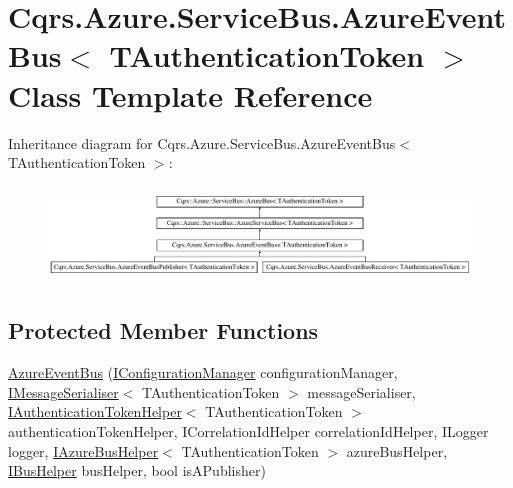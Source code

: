 \hypertarget{classCqrs_1_1Azure_1_1ServiceBus_1_1AzureEventBus}{}\section{Cqrs.\+Azure.\+Service\+Bus.\+Azure\+Event\+Bus$<$ T\+Authentication\+Token $>$ Class Template Reference}
\label{classCqrs_1_1Azure_1_1ServiceBus_1_1AzureEventBus}
Inheritance diagram for Cqrs.\+Azure.\+Service\+Bus.\+Azure\+Event\+Bus$<$ T\+Authentication\+Token $>$\+:\begin{figure}[H]
\begin{center}
\leavevmode
\includegraphics[height=2.533937cm]{classCqrs_1_1Azure_1_1ServiceBus_1_1AzureEventBus}
\end{center}
\end{figure}
\subsection*{Protected Member Functions}
\begin{DoxyCompactItemize}
\item 
\hyperlink{classCqrs_1_1Azure_1_1ServiceBus_1_1AzureEventBus_aaaf74d2e4e79924b7231750478508ed6_aaaf74d2e4e79924b7231750478508ed6}{Azure\+Event\+Bus} (\hyperlink{interfaceCqrs_1_1Configuration_1_1IConfigurationManager}{I\+Configuration\+Manager} configuration\+Manager, \hyperlink{interfaceCqrs_1_1Azure_1_1ServiceBus_1_1IMessageSerialiser}{I\+Message\+Serialiser}$<$ T\+Authentication\+Token $>$ message\+Serialiser, \hyperlink{interfaceCqrs_1_1Authentication_1_1IAuthenticationTokenHelper}{I\+Authentication\+Token\+Helper}$<$ T\+Authentication\+Token $>$ authentication\+Token\+Helper, I\+Correlation\+Id\+Helper correlation\+Id\+Helper, I\+Logger logger, \hyperlink{interfaceCqrs_1_1Azure_1_1ServiceBus_1_1IAzureBusHelper}{I\+Azure\+Bus\+Helper}$<$ T\+Authentication\+Token $>$ azure\+Bus\+Helper, \hyperlink{interfaceCqrs_1_1Bus_1_1IBusHelper}{I\+Bus\+Helper} bus\+Helper, bool is\+A\+Publisher)
\end{DoxyCompactItemize}
